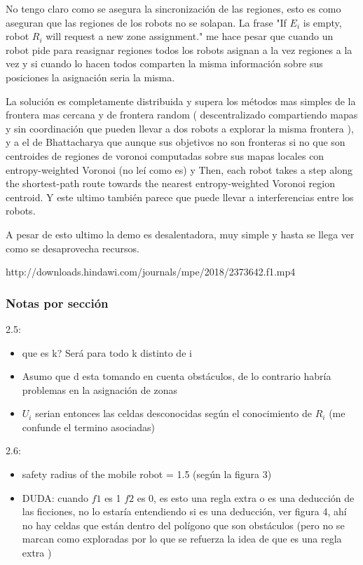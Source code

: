 No tengo claro como se asegura la sincronización de las regiones, esto es como aseguran que las regiones de los robots no se solapan. La frase "If $E_i$ is empty, robot $R_i$ will request a new zone assignment." me hace pesar que cuando un robot pide para reasignar regiones todos los robots asignan a la vez regiones a la vez y si cuando lo hacen todos comparten la misma información sobre sus posiciones la asignación seria la misma.

La solución es completamente distribuida y supera los métodos mas simples de la frontera mas cercana y de frontera random ( descentralizado compartiendo mapas y sin coordinación que pueden llevar a dos robots a explorar la misma frontera ), y a el de Bhattacharya que aunque sus objetivos no son fronteras si no que son centroides de regiones de voronoi computadas sobre sus mapas locales con entropy-weighted Voronoi (no leí como es) y Then, each robot takes a step along the shortest-path route towards the nearest entropy-weighted Voronoi region centroid. Y este ultimo también parece que puede llevar a interferencias entre los robots.

A pesar de esto ultimo la demo es desalentadora, muy simple y hasta se llega ver como se desaprovecha recursos.

http://downloads.hindawi.com/journals/mpe/2018/2373642.f1.mp4

\subsubsection{Notas por sección}
2.5:
\begin{itemize}
  \item que es k? Será para todo k distinto de i
  \item  Asumo que d esta tomando en cuenta obstáculos, de lo contrario habría problemas en la asignación de zonas
  \item  $U_i$ serian entonces las celdas desconocidas según el conocimiento de $R_i$ (me confunde el termino asociadas)
\end{itemize}

2.6:
\begin{itemize}
  \item safety radius of the mobile robot = 1.5 (según la figura 3)
  \item DUDA: cuando $f1$ es 1 $f2$ es 0, es esto una regla extra o es una deducción de las ficciones, no lo estaría entendiendo si es una deducción, ver figura 4, ahí no hay celdas que están dentro del polígono que son obstáculos (pero no se marcan como exploradas por lo que se refuerza la idea de que es una regla extra )
\end{itemize}

